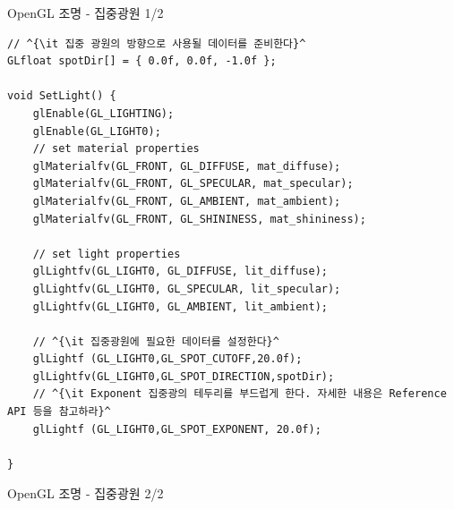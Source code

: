 \documentclass{beamer}
\begin{document}
\begin{frame}[fragile]{OpenGL 조명 - 집중광원 1/2}

\lstset{language=C++, escapechar=^} 
\begin{lstlisting}
// ^{\it 집중 광원의 방향으로 사용될 데이터를 준비한다}^
GLfloat spotDir[] = { 0.0f, 0.0f, -1.0f };

void SetLight() {
    glEnable(GL_LIGHTING);
    glEnable(GL_LIGHT0);
    // set material properties
    glMaterialfv(GL_FRONT, GL_DIFFUSE, mat_diffuse);
    glMaterialfv(GL_FRONT, GL_SPECULAR, mat_specular);
    glMaterialfv(GL_FRONT, GL_AMBIENT, mat_ambient);
    glMaterialfv(GL_FRONT, GL_SHININESS, mat_shininess);

    // set light properties
    glLightfv(GL_LIGHT0, GL_DIFFUSE, lit_diffuse);
    glLightfv(GL_LIGHT0, GL_SPECULAR, lit_specular);
    glLightfv(GL_LIGHT0, GL_AMBIENT, lit_ambient);

    // ^{\it 집중광원에 필요한 데이터를 설정한다}^    
    glLightf (GL_LIGHT0,GL_SPOT_CUTOFF,20.0f);
    glLightfv(GL_LIGHT0,GL_SPOT_DIRECTION,spotDir);
    // ^{\it Exponent 집중광의 테두리를 부드럽게 한다. 자세한 내용은 Reference API 등을 참고하라}^
    glLightf (GL_LIGHT0,GL_SPOT_EXPONENT, 20.0f);

}
\end{lstlisting}

\end{frame}


\begin{frame}[fragile]{OpenGL 조명 - 집중광원 2/2}

\begin{figure}[h!]
  \centering
\end{figure}

\end{frame}
\end{document}
